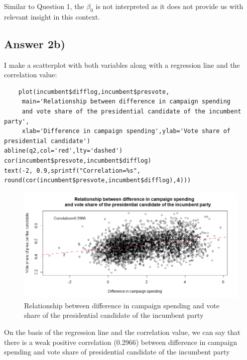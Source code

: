 \documentclass{article}
\begin{document}
\noindent Similar to Question 1, the $\beta_0$ is not interpreted as it does not provide us with relevant insight in this context.


\subsection{Answer 2b)}
I make a scatterplot with both variables along with a regression line and the correlation value:
\begin{verbatim}
    plot(incumbent$difflog,incumbent$presvote, 
     main='Relationship between difference in campaign spending 
     and vote share of the presidential candidate of the incumbent party',
     xlab='Difference in campaign spending',ylab='Vote share of presidential candidate')
abline(q2,col='red',lty='dashed')
cor(incumbent$presvote,incumbent$difflog)
text(-2, 0.9,sprintf("Correlation=%s", round(cor(incumbent$presvote,incumbent$difflog),4)))
\end{verbatim}

\begin{figure}[h!] %
    \centering
    \includegraphics[width=1.3\textwidth]{Q2PS3.png}
    \caption{Relationship between difference in campaign spending 
     and vote share of the presidential candidate of the incumbent party}
    \label{}
\end{figure}

On the basis of the regression line and the correlation value, we can say that there is a weak positive correlation (0.2966) between difference in campaign spending and vote share of presidential candidate of the incumbent party
\end{document}
